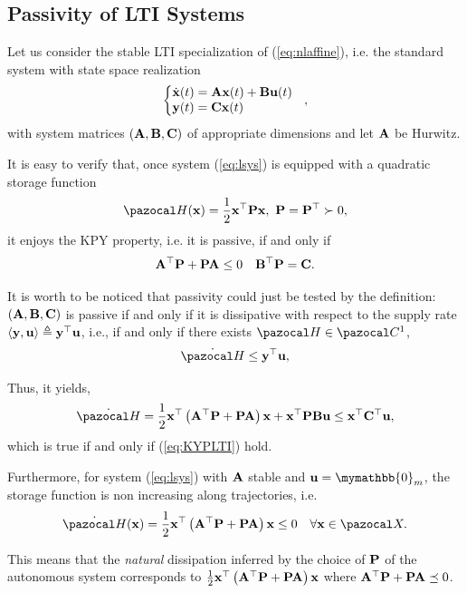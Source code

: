 \subsection{Passivity of LTI Systems}
%
Let us consider the stable LTI specialization of (\ref{eq:nlaffine}), i.e. the standard system with state space realization
%
\begin{equation}\label{eq:lsys}
\left\{
\begin{matrix*}[l]
\dot{\xb}(t) = \Ab\xb(t) + \Bb\ub(t)\\
\yb(t) = \Cb\xb(t)
\end{matrix*}
\right.~~,
\end{equation}
with system matrices $(\mathbf{A},\mathbf{B},\mathbf{C})$ of appropriate dimensions and let $\mathbf{A}$ be Hurwitz.
%
{
It is easy to verify that, once system (\ref{eq:lsys}) is equipped with a quadratic storage function 
\begin{equation}
    \Ha(\xb) = \frac{1}{2}\xb^\top \Pb\xb,~\Pb = \Pb^\top \succ 0,
\end{equation}
it enjoys the KPY property, i.e. it is passive, if and only if
%
\begin{equation}\label{eq:KYPLTI}
        \mathbf{A}^\top \mathbf{P} + \mathbf{P}\mathbf{A} \leq 0\quad
        \mathbf{B}^\top \mathbf{P} = \mathbf{C}.
\end{equation}
%
\begin{rem}
    It is worth to be noticed that passivity could just be tested by the definition:
    $(\mathbf{A},\mathbf{B},\mathbf{C})$ is passive if and only if it is dissipative with respect to the supply rate $\langle \mathbf{y},\mathbf{u} \rangle\triangleq \mathbf{y}^\top \mathbf{u}$, i.e.,  if and only if there exists $\Ha\in\C^1$,
    \begin{equation}
        \dot{\Ha}\leq \yb^\top \ub,
    \end{equation}
    
    Thus, it yields,
    \begin{align}
        \dot{\Ha} =  \frac{1}{2}\xb^\top \left(\Ab^\top \Pb + \Pb\Ab\right)\xb + \xb^\top \Pb\Bb\ub \leq \xb^\top \Cb^\top \ub,
    \end{align}
    which is true if and only if (\ref{eq:KYPLTI}) hold.
\end{rem}
%
Furthermore, for system (\ref{eq:lsys}) with $\mathbf{A}$ stable and $\ub=\mymathbb{0}_m$, the storage function is non increasing along trajectories, i.e.
%
\begin{equation}
    \dot{\Ha}(\xb) =  \frac{1}{2}\xb^\top \left(\Ab^\top \Pb + \Pb\Ab\right)\xb\leq 0\quad\forall \xb\in\X.
\end{equation}
%

This means that the \textit{natural} dissipation inferred by the choice of $\mathbf{P}$ of the autonomous system corresponds to $\frac{1}{2}\mathbf{x}^\top \left(\mathbf{A}^\top \mathbf{P} + \mathbf{P}\mathbf{A}\right)\mathbf{x}$ where $\mathbf{A}^\top\mathbf{P}+\mathbf{P}\mathbf{A}\preceq 0$. 
}

